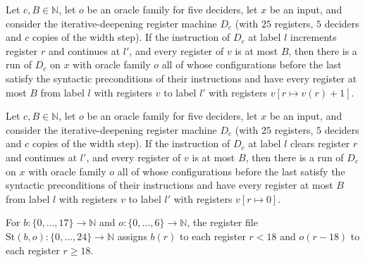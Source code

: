\begin{theorem}
\label{Complexity.LogProg.SavitchARM.dp_inc}
\leanok
{}
Let $c,B\in\mathbb{N}$, let $o$ be an oracle family for five deciders, let $x$ be an input, and
consider the iterative-deepening register machine $D_c$ (with $25$ registers, $5$ deciders and $c$ copies of the width step). If the instruction of $D_c$ at label $l$ increments register $r$ and continues at
$l'$, and every register of $v$ is at most $B$, then there is a run of $D_c$ on $x$ with oracle family $o$ all of whose configurations before the last satisfy the syntactic preconditions of their instructions and have every register at most $B$ from label $l$ with registers
$v$ to label $l'$ with registers $v[r\mapsto v(r)+1]$.
\end{theorem}

\begin{theorem}
\label{Complexity.LogProg.SavitchARM.dp_clr}
\leanok
{}
Let $c,B\in\mathbb{N}$, let $o$ be an oracle family for five deciders, let $x$ be an input, and
consider the iterative-deepening register machine $D_c$ (with $25$ registers, $5$ deciders and $c$ copies of the width step). If the instruction of $D_c$ at label $l$ clears register $r$ and continues at $l'$,
and every register of $v$ is at most $B$, then there is a run of $D_c$ on $x$ with oracle family $o$ all of whose configurations before the last satisfy the syntactic preconditions of their instructions and have every register at most $B$ from label $l$ with registers $v$ to
label $l'$ with registers $v[r\mapsto 0]$.
\end{theorem}

\begin{definition}
\label{Complexity.LogProg.SavitchARM.dpSt}
\leanok
For $b:\{0,\dots,17\}\to\mathbb{N}$ and $o:\{0,\dots,6\}\to\mathbb{N}$, the register file
$\mathrm{St}(b,o):\{0,\dots,24\}\to\mathbb{N}$ assigns $b(r)$ to each register $r<18$ and
$o(r-18)$ to each register $r\ge 18$.
\end{definition}

